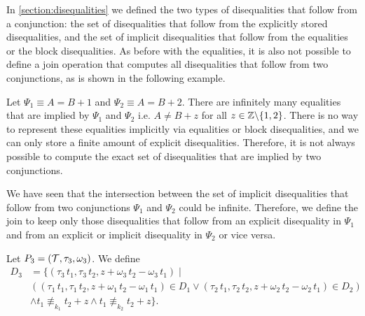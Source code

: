 In \cref{section:disequalities} we defined the two types of disequalities that follow from a conjunction:
the set of disequalities that follow from the explicitly stored disequalities,
and the set of implicit disequalities that follow from the equalities or the block disequalities.
As before with the equalities, it is also not possible to define a join operation that computes all disequalities that follow from two conjunctions, as is shown in the following example.

\begin{example}
    Let $\Psi_1 \equiv A = B + 1$ and $\Psi_2 \equiv A = B + 2$. There are infinitely many equalities that are implied by $\Psi_1$ and $\Psi_2$ i.e. $A \neq B + z$ for all $z \in \mathbb{Z} \backslash \{1,2\}$.
    There is no way to represent these equalities implicitly via equalities or block disequalities,
    and we can only store a finite amount of explicit disequalities.
    Therefore, it is not always possible to compute the exact set of disequalities that are implied by two conjunctions.
\end{example}

We have seen that the intersection between the set of implicit disequalities that follow from two conjunctions $\Psi_1$ and $\Psi_2$ could be infinite.
Therefore, we define the join to keep only those disequalities that follow from an explicit disequality in $\Psi_1$ and from an explicit or implicit disequality in $\Psi_2$ or vice versa.

Let $P_3 = (\mathcal{T}, \tau_3, \omega_3)$.
We define
\[
    \begin{array}{ll}
        D_3 & = \{(\tau_3\,t_1, \tau_3\,t_2, z + \omega_3\,t_2 - \omega_3\,t_1) \mid                                                                             \\
            & ((\tau_1\,t_1, \tau_1\,t_2, z + \omega_1\,t_2 - \omega_1\,t_1) \in D_1 \lor (\tau_2\,t_1, \tau_2\,t_2, z + \omega_2\,t_2 - \omega_2\,t_1) \in D_2) \\
            & \land t_1 \nequiv_{k_1} t_2 + z \land t_1 \nequiv_{k_2} t_2 + z\}.
    \end{array}
\]

